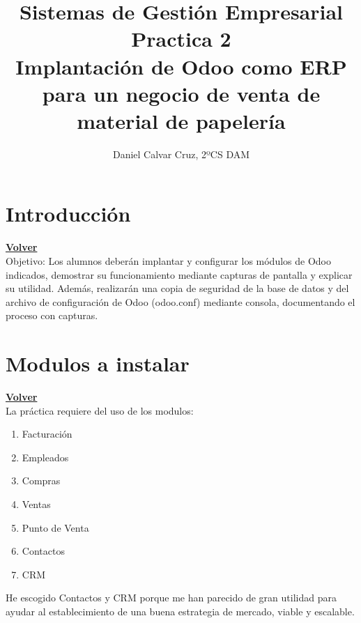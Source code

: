 \documentclass[a4paper,12pt]{article}
\title{\textbf{Sistemas de Gestión Empresarial}\\[1em]\textbf{Practica 2}\\[1em]Implantación de Odoo como ERP para un negocio de venta de material de
papelería}
\author{Daniel Calvar Cruz, 2ºCS DAM}
\date{}
\begin{document}
\maketitle
\clearpage
\hypertarget{anchor-indice}{}
\tableofcontents
\newpage

\section{Introducción}
\hyperlink{anchor-indice}{\textbf{Volver}}\\

Objetivo:
Los alumnos deberán implantar y configurar los módulos de Odoo indicados,
demostrar su funcionamiento mediante capturas de pantalla y explicar su utilidad.
Además, realizarán una copia de seguridad de la base de datos y del archivo de
configuración de Odoo (odoo.conf) mediante consola, documentando el proceso con
capturas.


\section{Modulos a instalar}
\hyperlink{anchor-indice}{\textbf{Volver}}\\

La práctica requiere del uso de los modulos: 
\begin{enumerate}
    \item Facturación
    \item Empleados
    \item Compras
    \item Ventas
    \item Punto de Venta
    \item Contactos
    \item CRM
\end{enumerate}

He escogido Contactos y CRM porque me han parecido de gran utilidad para ayudar al establecimiento de una buena estrategia de mercado, viable y escalable.
\end{document}
